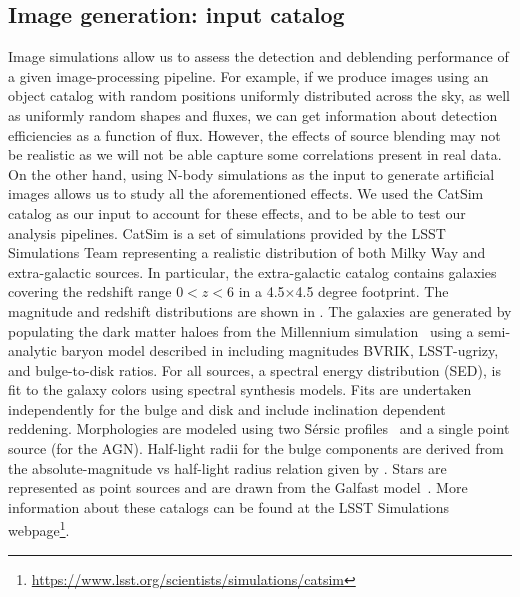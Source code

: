 \documentclass[\docopts]{\docclass}
\begin{document}
\subsection{Image generation: input catalog}
\label{sec:inputs}
Image simulations allow us to assess the detection and deblending performance of a given image-processing pipeline. For example, if we produce images using an object catalog with random positions uniformly distributed across the sky, as well as uniformly random shapes and fluxes, we can get information about detection efficiencies as a function of flux. However, the effects of source blending may not be realistic as we will not be able capture some correlations present in real data. On the other hand, using N-body simulations as the input to generate artificial images allows us to study all the aforementioned effects. We used the CatSim~\citep{2010SPIE.7738E..1OC,2014SPIE.9150E..14C} catalog as our input to account for these effects, and to be able to test our analysis pipelines. CatSim is a set of simulations provided by the LSST Simulations Team representing a realistic distribution of both Milky Way and extra-galactic sources. In particular, the extra-galactic catalog contains galaxies covering the redshift range $0 < z < 6$ in a 4.5$\times$4.5 degree footprint. The magnitude and redshift distributions are shown in . The galaxies are generated by populating the dark matter haloes from the Millennium simulation~\citep{2005Nature.435.629S} using a semi-analytic baryon model described in \citet{2006MNRAS.366..499D} including magnitudes BVRIK, LSST-ugrizy, and bulge-to-disk ratios. For all sources, a spectral energy distribution (SED), is fit to the galaxy colors using \citet{2003MNRAS.344.1000B} spectral synthesis models. Fits are undertaken independently for the bulge and disk and include inclination dependent reddening. Morphologies are modeled using two S\'{e}rsic profiles~\citep{1963BAAA....6...41S} and a single point source (for the AGN). Half-light radii for the bulge components are derived from the absolute-magnitude vs half-light radius relation given by \citet{2011A&A...534A...3G}. Stars are represented as point sources and are drawn from the Galfast model~\citep{2008ApJ...673..864J}. More information about these catalogs can be found at the LSST Simulations webpage\footnote{\url{https://www.lsst.org/scientists/simulations/catsim}}.
\end{document}
